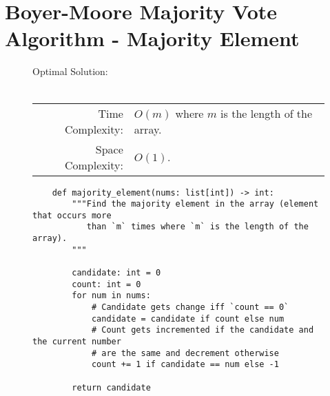 
\section{Boyer-Moore Majority Vote Algorithm - Majority Element}

\begin{figure}[H]
    Optimal Solution:\\\\
    \begin{tabular}{rl}
        Time Complexity:& \(O(m)\) where \(m\) is the length of the array.\\
        Space Complexity:& \(O(1)\).
    \end{tabular}
\end{figure}

\begin{figure}[H]
    \centering
    \begin{verbatim}
    def majority_element(nums: list[int]) -> int:
        """Find the majority element in the array (element that occurs more
           than `m` times where `m` is the length of the array).
        """

        candidate: int = 0
        count: int = 0
        for num in nums:
            # Candidate gets change iff `count == 0`
            candidate = candidate if count else num
            # Count gets incremented if the candidate and the current number
            # are the same and decrement otherwise
            count += 1 if candidate == num else -1

        return candidate
    \end{verbatim}
\end{figure}
